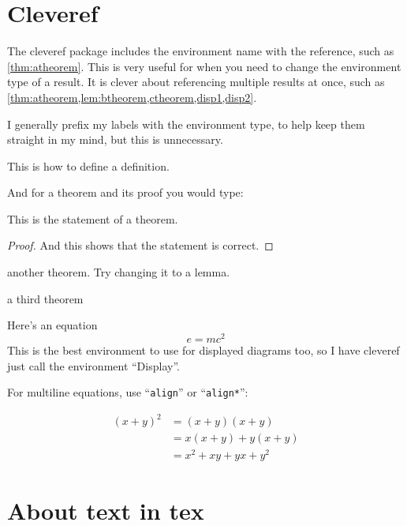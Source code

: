 \documentclass[11pt,oneside,draft]{amsart}
\begin{document}
\section{Cleveref}\label{sec:cleveref}

The cleveref package includes the environment name with the reference,
such as \cref{thm:atheorem}.  This is very useful for when you need to
change the environment type of a result.  It is clever about
referencing multiple results at once, such as
\cref{thm:atheorem,lem:btheorem,ctheorem,disp1,disp2}.

I generally prefix my labels with the environment type, to help keep
them straight in my mind, but this is unnecessary.

\begin{defn}  This is how to define a definition.
\end{defn}

And for a theorem and its proof you would type:

\begin{thm}\label{thm:atheorem}
This is the statement of a theorem.
\end{thm}
\begin{proof}
And this shows that the statement is correct.
\end{proof}

\begin{thm}\label{lem:btheorem}
  another theorem.  Try changing it to a lemma.
\end{thm}

\begin{thm}\label{ctheorem}
  a third theorem
\end{thm}

Here's an equation
\begin{equation}\label{disp1}
  e = mc^2
\end{equation}
This is the best environment to use for displayed diagrams too, so I
have cleveref just call the environment ``Display''.

For multiline equations, use ``\texttt{align}'' or
``\texttt{align*}'':

\begin{align}\label{disp2}
  (x + y)^2 & = (x+y) (x+y) \\
  & = x(x+y) + y(x+y) \nonumber\\
  & = x^2 + xy + yx + y^2 
\end{align}


\section{About text in tex}
\end{document}
